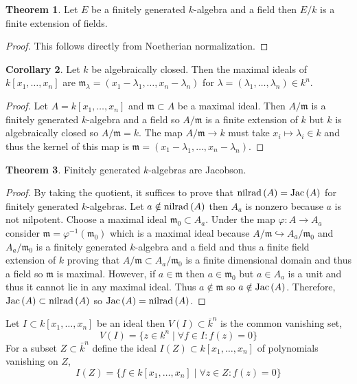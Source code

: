 \documentclass[12pt]{extarticle}
\theoremstyle{definition}
\newtheorem{theorem}{Theorem}[section]
\newtheorem{corollary}[theorem]{Corollary}
\newenvironment{definition}[1][Definition:]{\begin{trivlist}
\item[\hskip \labelsep {\bfseries #1}]}{\end{trivlist}}
\newcommand{\m}{\mathfrak{m}}
\newcommand{\embed}{\hookrightarrow}
\begin{document}
\begin{theorem}
Let $E$ be a finitely generated $k$-algebra and a field then $E / k$ is a finite extension of fields.
\end{theorem}

\begin{proof}
This follows directly from Noetherian normalization.
\end{proof}

\begin{corollary}
Let $k$ be algebraically closed. Then the maximal ideals of $k[x_1, \dots, x_n]$ are $\m_\lambda = (x_1 - \lambda_1, \dots, x_n - \lambda_n)$ for $\lambda = (\lambda_1, \dots, \lambda_n) \in k^n$.
\end{corollary}

\begin{proof}
Let $A = k[x_1, \dots, x_n]$ and $\m \subset A$ be a maximal ideal. Then $A / \m$ is a finitely generated $k$-algebra and a field so $A / \m$ is a finite extension of $k$ but $k$ is algebraically closed so $A / \m = k$. The map $A / \m \to k$ must take $x_i \mapsto \lambda_i \in k$ and thus the kernel of this map is $\m = (x_1 - \lambda_1, \dots, x_n - \lambda_n)$. 
\end{proof}

\begin{theorem}
Finitely generated $k$-algebras are Jacobson.
\end{theorem}

\begin{proof}
By taking the quotient, it suffices to prove that $\mathrm{nilrad}\left(A\right) = \mathrm{Jac}\left( A \right)$ for finitely generated $k$-algebras. Let $a \notin \mathrm{nilrad}\left(A\right)$ then $A_a$ is nonzero because $a$ is not nilpotent. Choose a maximal ideal $\m_0 \subset A_a$. Under the map $\varphi : A \to A_a$ consider $\m = \varphi^{-1}(\m_0)$ which is a maximal ideal because $A/\m \embed A_a / \m_0$ and $A_a / \m_0$ is a finitely generated $k$-algebra and a field and thus a finite field extension of $k$ proving that $A / \m \subset A_a / \m_0$ is a finite dimensional domain and thus a field so $\m$ is maximal. However, if $a \in \m$ then $a \in \m_0$ but $a \in A_a$ is a unit and thus it cannot lie in any maximal ideal. Thus $a \notin \m$ so $a \notin \mathrm{Jac}\left( A \right)$. Therefore, $\mathrm{Jac}\left( A \right) \subset \mathrm{nilrad}\left(A\right)$ so $\mathrm{Jac}\left( A \right) = \mathrm{nilrad}\left(A\right)$.
\end{proof}

\begin{definition}
Let $I \subset k[x_1, \dots, x_n]$ be an ideal then $V(I) \subset \bar{k}^n$ is the common vanishing set,
\[ V(I) = \{ z \in k^n \mid \forall f \in I : f(z) = 0 \} \]
For a subset $Z \subset \bar{k}^n$ define the ideal $I(Z) \subset k[x_1, \dots, x_n]$ of polynomials vanishing on $Z$,
\[ I(Z) = \{ f \in k[x_1, \dots, x_n] \mid \forall z \in Z : f(z) = 0 \} \]
\end{definition}
\end{document}
